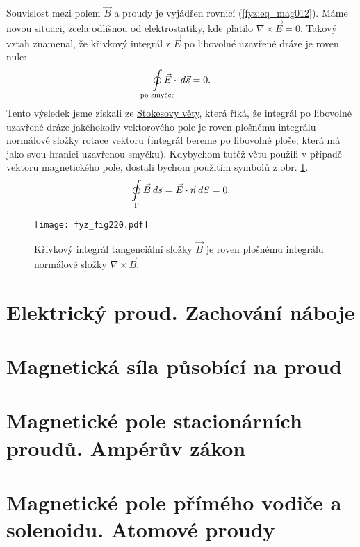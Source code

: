       Souvislost mezi polem \(\vec{B}\) a proudy je vyjádřen rovnicí (\ref{fyz:eq_mag012}). Máme 
      novou situaci, zcela odlišnou od elektrostatiky, kde platilo \(\nabla\times\vec{E}=0\). 
      Takový vztah znamenal, že křivkový integrál z \(\vec{E}\) po libovolné uzavřené dráze je 
      roven nule:
      \begin{equation}\label{fyz:eq_mag013} 
        \limitoint_{\mathclap{\substack{\text{po smyčce}}}}\vec{E}\cdot\dd{\vec{s}} = 0.
      \end{equation} 
      Tento výsledek jsme získali ze \hyperlink{fyz:sec_002}{Stokesovy věty}, která říká, že 
      integrál po libovolné uzavřené dráze jakéhokoliv vektorového pole je roven plošnému 
      integrálu normálové složky rotace vektoru (integrál bereme po libovolné ploše, která má jako 
      svou hranici uzavřenou smyčku). Kdybychom tutéž větu použili v případě vektoru magnetického 
      pole, dostali bychom použitím symbolů z obr. \ref{fyz:fig220}.
      \begin{equation}\label{fyz:eq_mag014} 
      \limitoint_{\mathclap{\substack{\Gamma}}}\vec{B}\dd{\vec{s}} = \vec{E}\cdot\vec{n}\dd{S} = 0.
      \end{equation} 
      
      \begin{figure}[ht!]
        \centering
        \texttt{[image: fyz\_fig220.pdf]}
        \caption{Křivkový integrál tangenciální složky \(\vec{B}\) je roven plošnému integrálu 
                 normálové složky \(\nabla\times\vec{B}\).}
        \label{fyz:fig220} 
      \end{figure}

  \section{Elektrický proud. Zachování náboje}\label{fyz:IIchapXIIIsecII}
  \section{Magnetická síla působící na proud}\label{fyz:IIchapXIIIsecIII}
  \section{Magnetické pole stacionárních proudů. Ampérův zákon }\label{fyz:IIchapXIIIsecIV}
  \section{Magnetické pole přímého vodiče a solenoidu. Atomové 
  proudy}\label{fyz:IIchapXIIIsecV}
